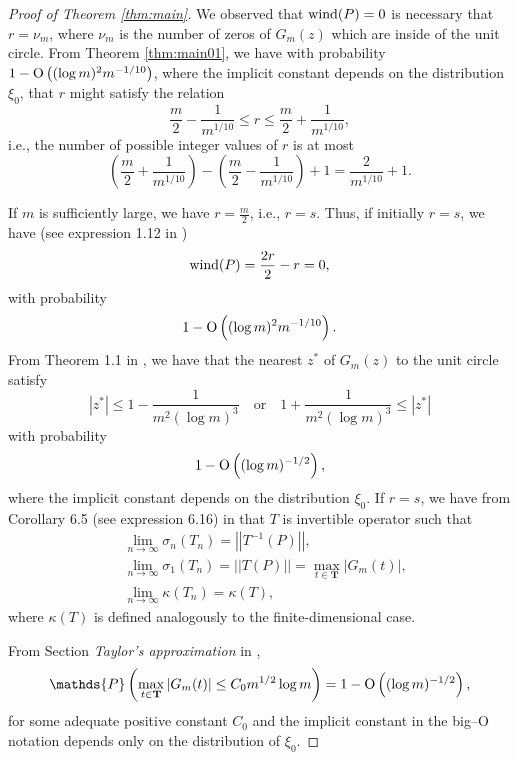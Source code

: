 \documentclass[12pt]{amsart}
\theoremstyle{plain}
\numberwithin{equation}{section}
\renewcommand{\Pr}{\mathbb{P}}
\newcommand{\<}{\langle}
\renewcommand{\>}{\rangle}
\newcommand{\PP}[1]{\left(#1\right)}
\newcommand{\abs}[1]{\left|#1\right|}
\newcommand{\norm}[1]{\left|\left|#1\right|\right|}
\renewcommand{\Pr}[1]{\mathds{P}\left(#1\right)}
\begin{document}
\begin{proof}[Proof of Theorem \ref{thm:main}]
We observed that $\textnormal{wind}(P)=0$ is necessary that $r=\nu_m$, where $\nu_m$ is the number of zeros of $G_m(z)$ which are inside of the unit circle. From Theorem \ref{thm:main01}, we have with probability $1-\textnormal{O}\PP{ {(\log m)^2}{m^{-1/10}} }$, where the implicit constant depends on the distribution $\xi_0$, that $r$ might satisfy the relation
\[
\frac{m}{2} - \frac{1}{m^{1/10}} \leq r \leq \frac{m}{2} + \frac{1}{m^{1/10}},
\]
i.e., the number of possible integer values of $r$ is at most
\[
\PP{ \frac{m}{2} + \frac{1}{m^{1/10}} } - \PP{  \frac{m}{2} - \frac{1}{m^{1/10}} } + 1 = \frac{2}{m^{1/10}} + 1.
\]

If $m$ is sufficiently large, we have $r=\frac{m}{2}$, i.e., $r=s$. Thus, if initially $r=s$, we have (see expression 1.12 in \cite{bottcher2005spectral})
\[
\textnormal{wind}(P)= \frac{2r}{2} - r = 0,
\]
with probability 
\[
1-\textnormal{O}\PP{ {(\log m)^2}{m^{-1/10}} }.
\]
From Theorem 1.1 in \cite{barrera2022zero}, we have that the nearest $z^{*}$ of $G_m(z)$ to the unit circle satisfy
\[
\abs{z^{*}} \leq 1 - \frac{1}{m^2(\log m)^3} \quad \mbox{or} \quad 1 + \frac{1}{m^2(\log m)^3} \leq \abs{z^{*}}
\]
with probability
\[
1-\textnormal{O}\PP{(\log m)^{-1/2}},
\]
where the implicit constant depends on the distribution $\xi_0$. If $r=s$, we have from Corollary 6.5 (see expression 6.16) in \cite{bottcher2005spectral} that $T$ is invertible operator such that
 \begin{align*}
& \lim_{n\to\infty} \sigma_n(T_n) = \norm{T^{-1}(P)}, \\
& \lim_{n\to\infty} \sigma_1(T_n) = \norm{T(P)} = \max_{t\in\mathbf{T}} \abs{G_{m}(t)}, \\
& \lim_{n\to\infty} \kappa(T_n)  = \kappa(T),
\end{align*}
where $\kappa(T)$ is defined analogously to the finite-dimensional case.

From Section {\it Taylor’s approximation} in \cite{barrera2022zero}, 
\begin{equation}\label{eqn:max.pol}
\Pr{\max_{t\in\mathbf{T}} \abs{G_{m}(t)} \leq C_0 m^{1/2}\log m  } = 1 -  \textnormal{O}\PP{(\log m)^{-1/2}},
\end{equation}
for some adequate positive constant $C_0$ and the implicit constant in the big--O notation depends only on the distribution of $\xi_0$.


\end{proof}
\end{document}
